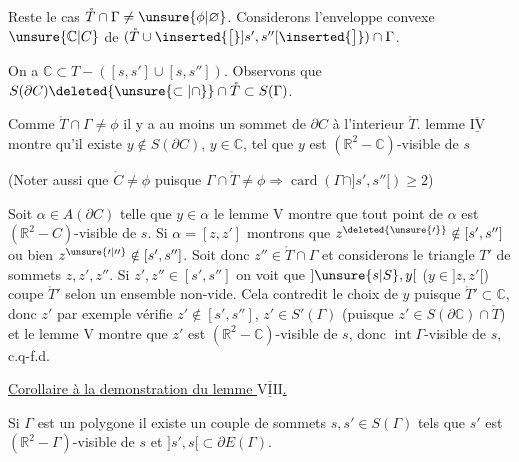 \margin{!!}Reste le cas $\mathring{T}\cap\Gamma\ne\unsure{\phi|\varnothing}$. Considerons l'enveloppe convexe $\unsure{\mathbb{C}|C}$ de $(\mathring{T}\cup\inserted{\bigl[}]s',s''[\inserted{\bigr]})\cap\Gamma$.

On a $\mathbb{C}\subset T-([s,s']\cup[s,s''])$. Observons que $S(\partial C)\deleted{\unsure{\subset|\cap}}\cap\mathring{T}\subset S(\Gamma)$.

Comme $\mathring{T}\cap\Gamma\ne\phi$ il y a au moins un sommet de $\partial C$ à l'interieur $\mathring{T}$.  lemme $\underline{\overline{\mathrm{IV}}}$ montre qu'il existe $y\notin S(\partial C)$, $y\in\mathbb{C}$, tel que $y$ est $(\mathbb{R}^2-\mathbb{C})$-visible de $s$

(Noter aussi que $\mathring{C}\ne\phi$ puisque $\Gamma\cap\mathring{T}\ne\phi\Rightarrow\operatorname{card}(\Gamma\cap]s',s''[)\geq 2$)

Soit $\alpha\in A(\partial C)$ telle que $y\in\alpha$ le lemme V montre que tout point de $\alpha$ est $(\mathbb{R}^2-C)$-visible de $s$. Si $\alpha=[z,z']$ montrons que $z^{\deleted{\unsure{\prime}}}\notin[s',s'']$ ou bien $z^{\unsure{\prime|\prime\prime}}\notin[s',s'']$. Soit donc $z''\in\mathring{T}\cap\Gamma$ et considerons le triangle $T'$ de sommets $z,z',z''$. Si $z',z''\in[s',s'']$ on voit que $]\unsure{s|S},y[$ ($y\in]z,z'[$) coupe $\mathring{T}'$ selon un ensemble non-vide. Cela contredit le choix de $y$ puisque $\mathring{T}'\subset\mathbb{C}$,  donc $z'$ par exemple vérifie $z'\notin[s',s'']$, $z'\in S'(\Gamma)$ (puisque $z'\in S(\partial\mathbb{C})\cap\mathring{T}$) et le lemme  V montre que $z'$ est $(\mathbb{R}^2-\mathbb{C})$-visible de $s$, donc $\operatorname{int}\Gamma$-visible de $s$, c.q-f.d.

\uline{Corollaire à la demonstration du lemme $\underline{\overline{\mathrm{VIII}}}$.} \margin{!!}

Si $\Gamma$ est un polygone il existe un couple de sommets  $s,s'\in S(\Gamma)$ tels que $s'$ est  $(\mathbb{R}^2-\Gamma)$-visible de $s$ et $]s',s[\subset\partial E(\Gamma)$.
